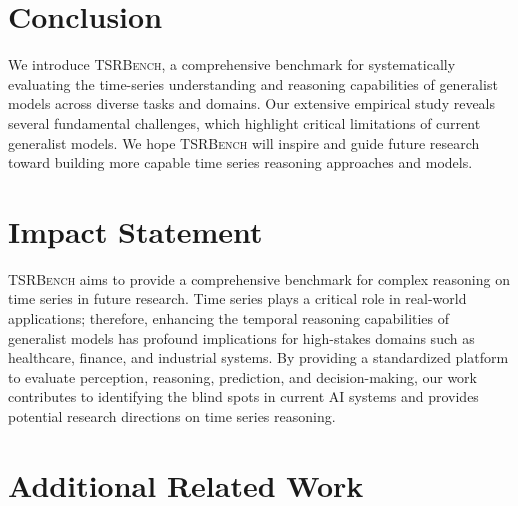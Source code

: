 \documentclass{article}
\theoremstyle{plain}
\theoremstyle{definition}
\theoremstyle{remark}
\newcommand\ours{\textsc{TSRBench}\xspace}
\theoremstyle{plain}
\begin{document}
\section{Conclusion}
We introduce \ours, a comprehensive benchmark for systematically evaluating the time-series understanding and reasoning capabilities of generalist models across diverse tasks and domains. Our extensive empirical study reveals several fundamental challenges, which highlight critical limitations of current generalist models. We hope \ours will inspire and guide future research toward building more capable time series reasoning approaches and models.

\section*{Impact Statement}
\ours aims to provide a comprehensive benchmark for complex reasoning on time series in future research. Time series plays a critical role in real-world applications; therefore, enhancing the temporal reasoning capabilities of generalist models has profound implications for high-stakes domains such as healthcare, finance, and industrial systems. By providing a standardized platform to evaluate perception, reasoning, prediction, and decision-making, our work contributes to identifying the blind spots in current AI systems and provides potential research directions on time series reasoning.



\newpage
\appendix
\onecolumn
\section{Additional Related Work}
\end{document}
